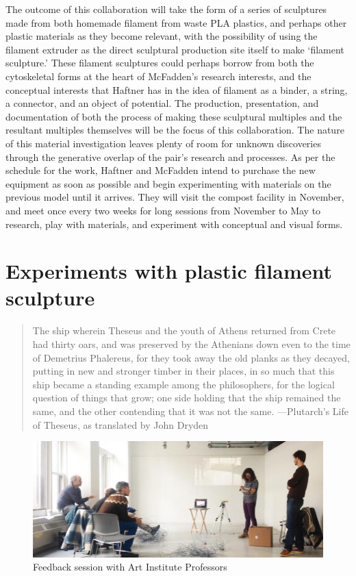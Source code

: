 The outcome of this collaboration will take the form of a series of sculptures made from both homemade filament from waste PLA plastics, and perhaps other plastic materials as they become relevant, with the possibility of using the filament extruder as the direct sculptural production site itself to make ‘filament sculpture.’ These filament sculptures could perhaps borrow from both the cytoskeletal forms at the heart of McFadden’s research interests, and the conceptual interests that Haftner has in the idea of filament as a binder, a string, a connector, and an object of potential. The production, presentation, and documentation of both the process of making these sculptural multiples and the resultant multiples themselves will be the focus of this collaboration. The nature of this material investigation leaves plenty of room for unknown discoveries through the generative overlap of the pair’s research and processes. As per the schedule for the work, Haftner and McFadden intend to purchase the new equipment as soon as possible and begin experimenting with materials on the previous model until it arrives. They will visit the compost facility in November, and meet once every two weeks for long sessions from November to May to research, play with materials, and experiment with conceptual and visual forms.





\section{Experiments with plastic filament sculpture}

{
	\blockquote{ The ship wherein Theseus and the youth of Athens returned from Crete had thirty oars, and was preserved by the Athenians down even to the time of Demetrius Phalereus, for they took away the old planks as they decayed, putting in new and stronger timber in their places, in so much that this ship became a standing example among the philosophers, for the logical question of things that grow; one side holding that the ship remained the same, and the other contending that it was not the same. ---Plutarch's Life of Theseus, as translated by John Dryden }
}

\begin{figure}[h!]
\centering
\includegraphics[width=\hsize]{art/collab1.jpg}
\caption{\label{fig:art_2} Feedback session with Art Institute Professors }
\end{figure}

